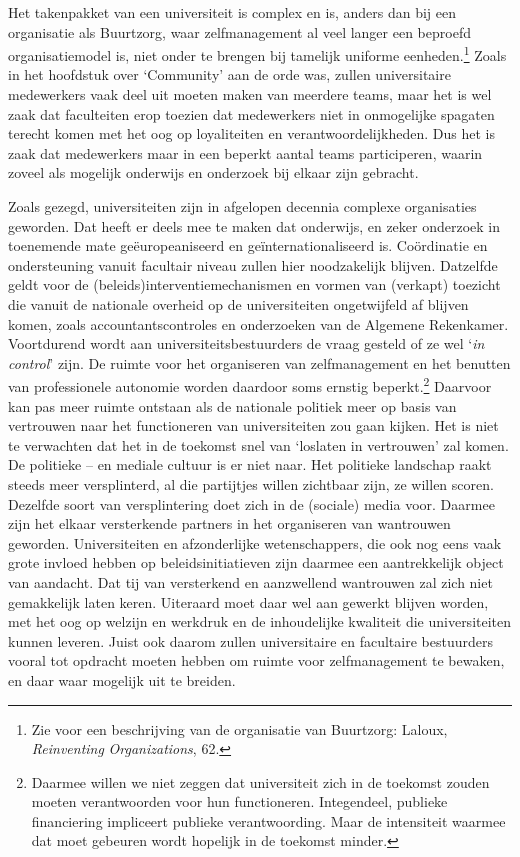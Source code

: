 \documentclass[smallauthor, chapterhaspagenum, nochapterinheader, pagenuminheader,  bigchapnum,medium2, tocpages, garamond, titleinheader]{jote-book}
\begin{document}
	Het takenpakket van een universiteit is complex en is, anders dan bij een organisatie als Buurtzorg, waar zelfmanagement al veel langer een beproefd organisatiemodel is, niet onder te brengen bij tamelijk uniforme eenheden.\footnote{Zie voor een beschrijving van de organisatie van Buurtzorg: Laloux, \emph{Reinventing}\emph{ }\emph{Organizations}, 62.} Zoals in het hoofdstuk over ‘Community' aan de orde was, zullen universitaire medewerkers vaak deel uit moeten maken van meerdere teams, maar het is wel zaak dat faculteiten erop toezien dat medewerkers niet in onmogelijke spagaten terecht komen met het oog op loyaliteiten en verantwoordelijkheden. Dus het is zaak dat medewerkers maar in een beperkt aantal teams participeren, waarin zoveel als mogelijk onderwijs en onderzoek bij elkaar zijn gebracht.



	Zoals gezegd, universiteiten zijn in afgelopen decennia complexe organisaties geworden. Dat heeft er deels mee te maken dat onderwijs, en zeker onderzoek in toenemende mate geëuropeaniseerd en geïnternationaliseerd is. Coördinatie en ondersteuning vanuit facultair niveau zullen hier noodzakelijk blijven. Datzelfde geldt voor de (beleids)interventiemechanismen en vormen van (verkapt) toezicht die vanuit de nationale overheid op de universiteiten ongetwijfeld af blijven komen, zoals accountantscontroles en onderzoeken van de Algemene Rekenkamer. Voortdurend wordt aan universiteitsbestuurders de vraag gesteld of ze wel ‘\emph{in control}' zijn. De ruimte voor het organiseren van zelfmanagement en het benutten van professionele autonomie worden daardoor soms ernstig beperkt.\footnote{Daarmee willen we niet zeggen dat universiteit zich in de toekomst zouden moeten verantwoorden voor hun functioneren. Integendeel, publieke financiering impliceert publieke verantwoording. Maar de intensiteit waarmee dat moet gebeuren wordt hopelijk in de toekomst minder.} Daarvoor kan pas meer ruimte ontstaan als de nationale politiek meer op basis van vertrouwen naar het functioneren van universiteiten zou gaan kijken. Het is niet te verwachten dat het in de toekomst snel van ‘loslaten in vertrouwen' zal komen. De politieke -- en mediale cultuur is er niet naar. Het politieke landschap raakt steeds meer versplinterd, al die partijtjes willen zichtbaar zijn, ze willen scoren. Dezelfde soort van versplintering doet zich in de (sociale) media voor. Daarmee zijn het elkaar versterkende partners in het organiseren van wantrouwen geworden. Universiteiten en afzonderlijke wetenschappers, die ook nog eens vaak grote invloed hebben op beleidsinitiatieven zijn daarmee een aantrekkelijk object van aandacht. Dat tij van versterkend en aanzwellend wantrouwen zal zich niet gemakkelijk laten keren. Uiteraard moet daar wel aan gewerkt blijven worden, met het oog op welzijn en werkdruk en de inhoudelijke kwaliteit die universiteiten kunnen leveren. Juist ook daarom zullen universitaire en facultaire bestuurders vooral tot opdracht moeten hebben om ruimte voor zelfmanagement te bewaken, en daar waar mogelijk uit te breiden.
\end{document}
